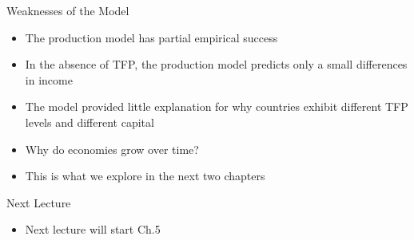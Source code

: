 \documentclass[aspectratio=1610]{beamer}
\begin{document}
\begin{frame}[wide]{Weaknesses of the Model}
	\begin{itemize}
		\item The production model has partial empirical success
		\item In the absence of TFP, the production model predicts only a small differences in income
		\item The model provided little explanation for why countries exhibit different TFP levels and different capital
		\item Why do economies grow over time?
		\item This is what we explore in the next two chapters
	\end{itemize}
\end{frame}


%
%			

\begin{frame}[wide]{Next Lecture}
	\begin{itemize}
		\item Next lecture will start Ch.5
	\end{itemize}
\end{frame}
\end{document}
